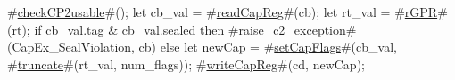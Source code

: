 #\hyperref[sailMIPSzcheckCP2usable]{checkCP2usable}#();
let cb_val = #\hyperref[sailMIPSzreadCapReg]{readCapReg}#(cb);
let rt_val = #\hyperref[sailMIPSzrGPR]{rGPR}#(rt);
if cb_val.tag & cb_val.sealed then
  #\hyperref[sailMIPSzraisezyc2zyexception]{raise\_c2\_exception}#(CapEx_SealViolation, cb)
else
{
  let newCap  = #\hyperref[sailMIPSzsetCapFlags]{setCapFlags}#(cb_val, #\hyperref[sailMIPSztruncate]{truncate}#(rt_val, num_flags));
  #\hyperref[sailMIPSzwriteCapReg]{writeCapReg}#(cd, newCap);
}
